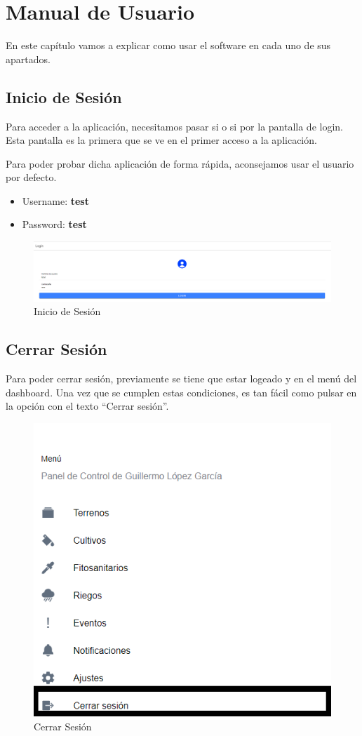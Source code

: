 \section{Manual de Usuario}
En este capítulo vamos a explicar como usar el software en cada uno de sus apartados.

\newpage

\subsection{Inicio de Sesión}
Para acceder a la aplicación, necesitamos pasar si o si por la pantalla de login. Esta pantalla es la primera que se ve en el primer acceso a la aplicación.

Para poder probar dicha aplicación de forma rápida, aconsejamos usar el usuario por defecto.
\begin{itemize}
    \item Username: \textbf{test}
    \item Password: \textbf{test}
\end{itemize}

\begin{figure}[H]
    \centering
    \includegraphics[width=1\linewidth]{images/user-manual/login.png}
    \caption{Inicio de Sesión}
\end{figure}

\subsection{Cerrar Sesión}
Para poder cerrar sesión, previamente se tiene que estar logeado y en el menú del dashboard. Una vez que se cumplen estas condiciones, es tan fácil como pulsar en la opción con el texto ``Cerrar sesión''.

\begin{figure}[H]
    \centering
    \includegraphics[width=0.7\linewidth]{images/user-manual/logout.png}
    \caption{Cerrar Sesión}
\end{figure}

